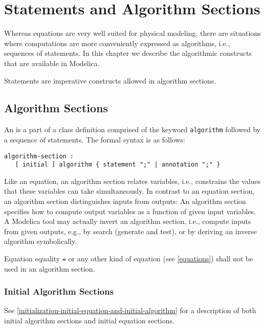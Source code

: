\chapter{Statements and Algorithm Sections}\label{statements-and-algorithm-sections}

Whereas equations are very well suited for physical modeling, there are
situations where computations are more conveniently expressed as
algorithms, i.e., sequences of statements. In this chapter we describe
the algorithmic constructs that are available in Modelica.

Statements are imperative constructs allowed in algorithm sections.

\section{Algorithm Sections}\label{algorithm-sections}

An  is a part of a class definition comprised of the keyword \lstinline!algorithm! followed by a sequence of statements.
The formal syntax is as follows:
\begin{lstlisting}[language=grammar]
algorithm-section :
   [ initial ] algorithm { statement ";" | annotation ";" }
\end{lstlisting}

Like an equation, an algorithm section relates variables, i.e., constrains the values that these variables can take simultaneously.
In contrast to an equation section, an algorithm section distinguishes inputs from outputs:
An algorithm section specifies how to compute output variables as a function of given input variables.
A Modelica tool may actually invert an algorithm section, i.e., compute inputs from given outputs, e.g., by search (generate and test), or by deriving an inverse algorithm symbolically.

Equation equality \lstinline!=! or any other kind of equation (see \cref{equations}) shall not be used in an algorithm section.

\subsection{Initial Algorithm Sections}\label{initial-algorithm-sections}

See \cref{initialization-initial-equation-and-initial-algorithm} for a description of both initial algorithm sections and
initial equation sections.

